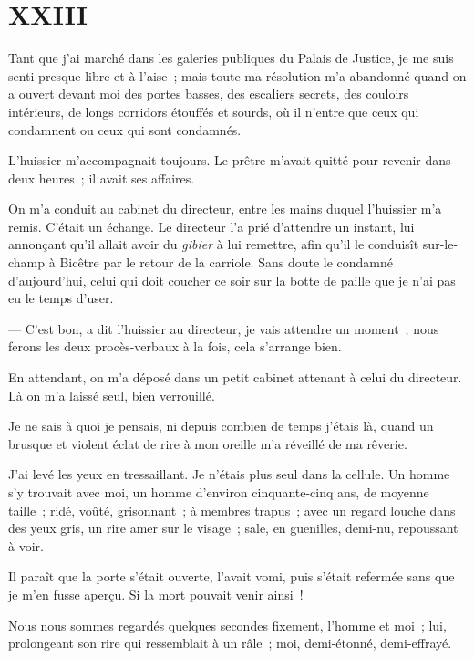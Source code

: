 \documentclass[french,twoside]{book} %
\begin{document}
 \section[{XXIII}]{XXIII}
\label{ch23}\renewcommand{\leftmark}{XXIII}

\noindent Tant que j’ai marché dans les galeries publiques du Palais de Justice, je me suis senti presque libre et à l’aise ; mais toute ma résolution m’a abandonné quand on a ouvert devant moi des portes basses, des escaliers secrets, des couloirs intérieurs, de longs corridors étouffés et sourds, où il n’entre que ceux qui condamnent ou ceux qui sont condamnés.\par
L’huissier m’accompagnait toujours. Le prêtre m’avait quitté pour revenir dans deux heures ; il avait ses affaires.\par
On m’a conduit au cabinet du directeur, entre les mains duquel l’huissier m’a remis. C’était un échange. Le directeur l’a prié d’attendre un instant, lui annonçant qu’il allait avoir du \emph{gibier} à lui remettre, afin qu’il le conduisît sur-le-champ à Bicêtre par le retour de la carriole. Sans doute le condamné d’aujourd’hui, celui qui doit coucher ce soir sur la botte de paille que je n’ai pas eu le temps d’user.\par
— C’est bon, a dit l’huissier au directeur, je vais  attendre un moment ; nous ferons les deux procès-verbaux à la fois, cela s’arrange bien.\par
En attendant, on m’a déposé dans un petit cabinet attenant à celui du directeur. Là on m’a laissé seul, bien verrouillé.\par
Je ne sais à quoi je pensais, ni depuis combien de temps j’étais là, quand un brusque et violent éclat de rire à mon oreille m’a réveillé de ma rêverie.\par
J’ai levé les yeux en tressaillant. Je n’étais plus seul dans la cellule. Un homme s’y trouvait avec moi, un homme d’environ cinquante-cinq ans, de moyenne taille ; ridé, voûté, grisonnant ; à membres trapus ; avec un regard louche dans des yeux gris, un rire amer sur le visage ; sale, en guenilles, demi-nu, repoussant à voir.\par
Il paraît que la porte s’était ouverte, l’avait vomi, puis s’était refermée sans que je m’en fusse aperçu. Si la mort pouvait venir ainsi !\par
Nous nous sommes regardés quelques secondes fixement, l’homme et moi ; lui, prolongeant son rire qui ressemblait à un râle ; moi, demi-étonné, demi-effrayé.\par
\end{document}
